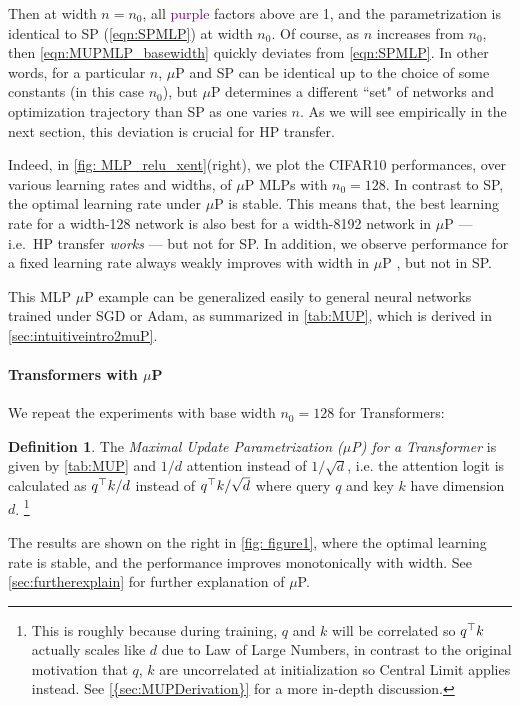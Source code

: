 \documentclass{article}
\theoremstyle{definition}
\newtheorem{defn}{Definition}[section]
\newcommand{\highlight}[1]{\textcolor{purple}{#1}}
\begin{document}
Then at width $n=n_0$, all \highlight{purple} factors above are 1, and the parametrization is identical to SP (\cref{eqn:SPMLP}) at width $n_0$.
Of course, as $n$ increases from $n_0$, then \cref{eqn:MUPMLP_basewidth} quickly deviates from \cref{eqn:SPMLP}.
In other words, for a particular $n$, $\mu$P and SP can be identical up to the choice of some constants (in this case $n_0$), but $\mu$P determines a different ``set" of networks and optimization trajectory than SP as one varies $n$.
As we will see empirically in the next section, this deviation is crucial for HP transfer.

Indeed, in \cref{fig: MLP_relu_xent}(right), we plot the CIFAR10 performances, over various learning rates and widths, of $\mu$P MLPs with $n_0 = 128$.
In contrast to SP,  the optimal learning rate under $\mu$P is stable.
This means that, the best learning rate for a width-128 network is also best for a width-8192 network in $\mu$P --- i.e.\ HP transfer \emph{works} --- but not for SP.
In addition, we observe performance for a fixed learning rate always weakly improves with width in $\mu$P , but not in SP.

This MLP $\mu$P example can be generalized easily to general neural networks trained under SGD or Adam, as summarized in \cref{tab:MUP}, 
which is derived in \cref{sec:intuitiveintro2muP}.

\paragraph{Transformers with $\mu$P}
We repeat the experiments with base width $n_0=128$ for Transformers:
\begin{defn}\label{defn:trsfmrMUP}
The \emph{Maximal Update Parametrization ($\mu$P) for a Transformer} is given by \cref{tab:MUP} and $1/d$ attention instead of $1/\sqrt{d}$, i.e. the attention logit is calculated as $q^\top k/d$ instead of $q^\top k / \sqrt d$ where query $q$ and key $k$ have dimension $d$.
\footnote{This is roughly because during training, $q$ and $k$ will be correlated so $q^\top k$ actually scales like $d$ due to Law of Large Numbers, in contrast to the original motivation that $q$, $k$ are uncorrelated at initialization so Central Limit applies instead.
See \cref{{sec:MUPDerivation}} for a more in-depth discussion.}
\end{defn}
The results are shown on the right in \cref{fig: figure1}, where the optimal learning rate is stable, and the performance improves monotonically with width.
See \cref{sec:furtherexplain} for further explanation of $\mu$P.
\end{document}
